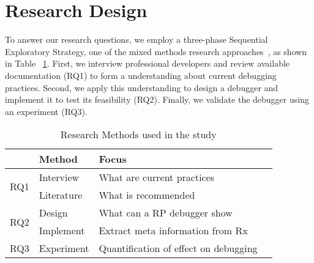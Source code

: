 \section{Research Design} %
To answer our research questions, we employ a three-phase Sequential
Exploratory Strategy, one of the mixed methods research approaches~\cite
{creswell2013research,hanson2005mixed}, as shown in Table~%
\ref{research-methods}.  First, we interview professional developers and
review available documentation (RQ1) to form a understanding about
current debugging practices. Second, we apply this understanding to
design a debugger and implement it to test its feasibility (RQ2).
Finally, we validate the debugger using an experiment (RQ3).

\begin{table}[t]
    \centering
    \begin{tabularx}{\columnwidth}
        {lllX}
        \hline
        \textbf{} & \textbf{Method} & \textbf{Focus} \\
        \hline
        \multirow{2}{*}{RQ1} & Interview & What are current practices \\
        & Literature & What is recommended \\
        \multirow{2}{*}{RQ2} & Design & What can a RP debugger show \\
        & Implement & Extract meta information from Rx \\
        RQ3 & Experiment & Quantification of effect on debugging \\
        \hline
    \end{tabularx}
    \caption{Research Methods used in the study}%
    \label{research-methods}
\end{table}
